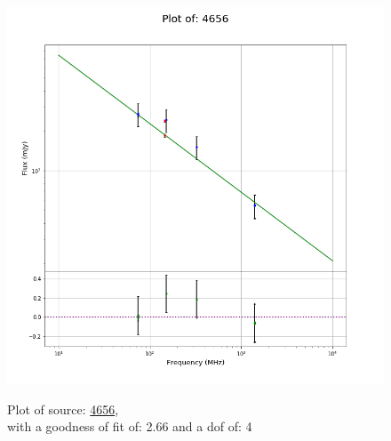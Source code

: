 \documentclass{article}
\begin{document}
\begin{figure}[H]
    \centering
    \begin{minipage}{.5\textwidth}
        \centering
        \includegraphics[scale = 0.35]{KmeulenSimSource_1hr/1hr4656.png}
        \captionsetup{labelformat=empty}
        \caption{Plot of source: \href{http://banana.transientskp.org/r4/vlo_KmeulenSimSource/runningcatalog/4656}{4656},\\with a goodness of fit of: 2.66 and a dof of: 4}
        \addtocounter{figure}{-1}
        \label{KmeulenSimSource:1hr:4656:plot}
    \end{minipage}%
    \begin{minipage}{0.5\textwidth}
        \centering


\end{minipage}
\end{figure}
\end{document}
